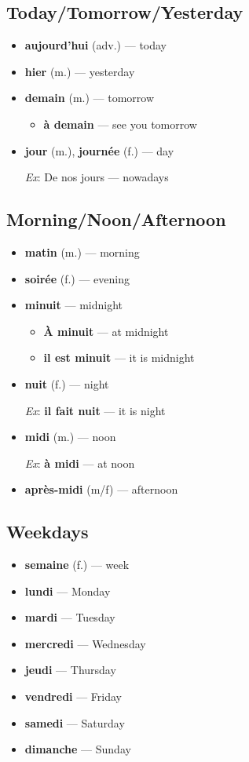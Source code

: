 \documentclass[a4paper,12pt]{article}
\begin{document}
	\subsection{Today/Tomorrow/Yesterday}
	\begin{itemize}
		\item \textbf{aujourd'hui} (adv.) --- today
		\item \textbf{hier} (m.) --- yesterday
		\item \textbf{demain} (m.) --- tomorrow
		\begin{itemize}
			\item \textbf{\`a demain} --- see you tomorrow
		\end{itemize}
		\item \textbf{jour} (m.), \textbf{journ\'ee} (f.) --- day
			\par
		\textit{Ex}: De nos jours --- nowadays
	\end{itemize}

	\subsection{Morning/Noon/Afternoon}
	\begin{itemize}
		\item \textbf{matin} (m.) --- morning
		\item \textbf{soir\'ee} (f.) --- evening
		\item \textbf{minuit} --- midnight
		\begin{itemize}
			\item \textbf{\`A minuit} --- at midnight
			\item \textbf{il est minuit} --- it is midnight
		\end{itemize}
		\item \textbf{nuit} (f.) --- night
		\par
		\textit{Ex}: \textbf{il fait nuit} --- it is night
		\item \textbf{midi} (m.) --- noon
		\par
		\textit{Ex}: \textbf{\`a midi} --- at noon
		\item \textbf{apr\`es-midi} (m/f) --- afternoon
	\end{itemize}

	\subsection{Weekdays}
	\begin{itemize}
		\item \textbf{semaine} (f.) --- week
		\item \textbf{lundi} --- Monday
		\item \textbf{mardi} --- Tuesday
		\item \textbf{mercredi} --- Wednesday
		\item \textbf{jeudi} --- Thursday
		\item \textbf{vendredi} --- Friday
		\item \textbf{samedi} --- Saturday
		\item \textbf{dimanche} --- Sunday
	\end{itemize}
\end{document}
